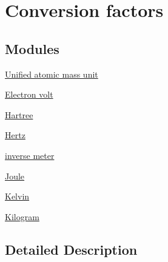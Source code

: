 \hypertarget{group___conversion_factors}{}\section{Conversion factors}
\label{group___conversion_factors}
\subsection*{Modules}
\begin{DoxyCompactItemize}
\item 
\hyperlink{group___atomic_mass_unit}{Unified atomic mass unit}
\item 
\hyperlink{group___electron_volt}{Electron volt}
\item 
\hyperlink{group___hartree}{Hartree}
\item 
\hyperlink{group___hertz}{Hertz}
\item 
\hyperlink{group___inverse_meter}{inverse meter}
\item 
\hyperlink{group___joule}{Joule}
\item 
\hyperlink{group___kelvin}{Kelvin}
\item 
\hyperlink{group___kilogram}{Kilogram}
\end{DoxyCompactItemize}


\subsection{Detailed Description}
